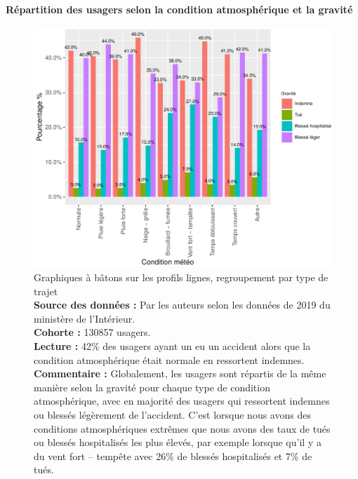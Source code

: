 \documentclass[french,]{tp}
\let\oldparagraph\paragraph
\renewcommand{\paragraph}[1]{\oldparagraph{#1}\mbox{}}
\begin{document}
\newpage

\hypertarget{ruxe9partition-des-usagers-selon-la-condition-atmosphuxe9rique-et-la-gravituxe9}{%
\paragraph{Répartition des usagers selon la condition atmosphérique et la gravité}\label{ruxe9partition-des-usagers-selon-la-condition-atmosphuxe9rique-et-la-gravituxe9}}







\begin{figure}[ht!]

{\centering \includegraphics{Prediction_Gravite_files/figure-latex/barplotatm-1} 

}

\caption{Graphiques à bâtons sur les profils lignes, regroupement par type de trajet\\
\textbf{Source des données :} Par les auteurs selon les données de 2019 du ministère de l'Intérieur.\\
\textbf{Cohorte :} 130857 usagers.\\
\textbf{Lecture :} 42\% des usagers ayant un eu un accident alors que la condition atmosphérique était normale en ressortent indemnes.\\
\textbf{Commentaire :} Globalement, les usagers sont répartis de la même manière selon la gravité pour chaque type de condition atmosphérique, avec en majorité des usagers qui ressortent indemnes ou blessés légèrement de l'accident. C'est lorsque nous avons des conditions atmosphériques extrêmes que nous avons des taux de tués ou blessés hospitalisés les plus élevés, par exemple lorsque qu'il y a du vent fort -- tempête avec 26\% de blessés hospitalisés et 7\% de tués.}\label{fig:barplotatm}
\end{figure}
\end{document}
